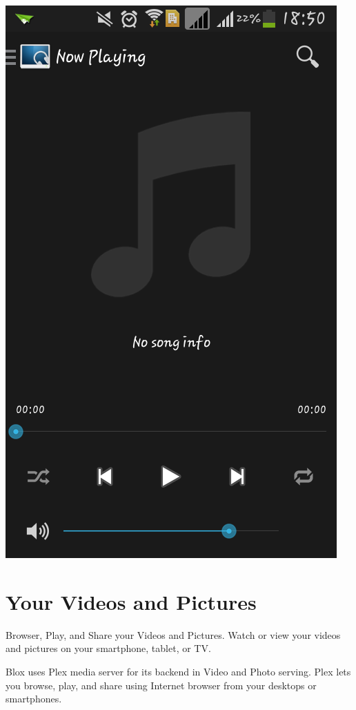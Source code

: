 \documentclass[letterpaper,10pt,english]{sphinxmanual}
\begin{document}
\begin{enumerate}
\includegraphics{mpd1.png}

\end{enumerate}


\chapter{Your Videos and Pictures}
\label{video_and_pictures:video-and-pictures}\label{video_and_pictures:your-videos-and-pictures}\label{video_and_pictures::doc}
Browser, Play, and Share your Videos and Pictures. Watch or view your videos and pictures on your smartphone, tablet, or TV.

Blox uses Plex media server for its backend in Video and Photo serving. Plex lets you browse, play, and share using Internet browser from your desktops or smartphones.
\end{document}
